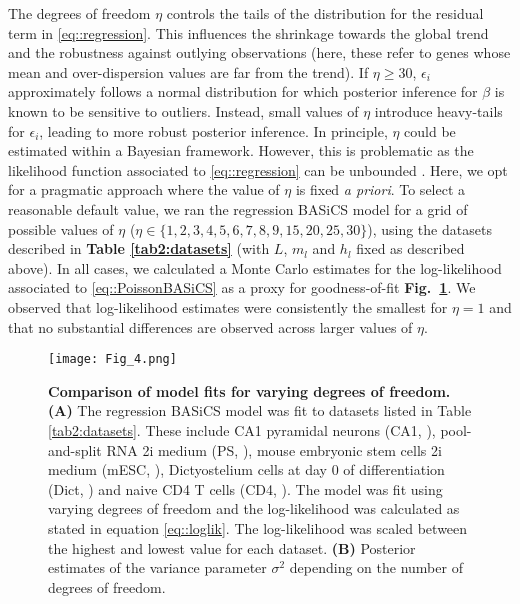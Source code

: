 The degrees of freedom $\eta$ controls the tails of the distribution for the residual term in \ref{eq::regression}. This influences the shrinkage towards the global trend and the robustness against outlying observations (here, these refer to genes whose mean and over-dispersion values are far from the trend).  If $\eta \geq 30$, $\epsilon_i$ approximately follows a normal distribution for which posterior inference for $\beta$ is known to be sensitive to outliers. Instead, small values of $\eta$ introduce heavy-tails for $\epsilon_i$, leading to more robust posterior inference. In principle, $\eta$ could be estimated within a Bayesian framework. However, this is problematic as the likelihood function associated to \ref{eq::regression} can be unbounded \citep{Fernandez1999}. Here, we opt for a pragmatic approach where the value of $\eta$ is fixed \emph{a priori}. To select a reasonable default value, we ran the regression BASiCS model for a grid of possible values of $\eta$ ($\eta \in \{ 1,2,3,4,5,6,7,8,9,15,20,25,30 \}$), using the datasets described in \textbf{Table \ref{tab2:datasets}} (with $L$, $m_l$ and $h_l$ fixed as described above). In all cases, we calculated a Monte Carlo estimates for the log-likelihood associated to \ref{eq::PoissonBASiCS} as a proxy for goodness-of-fit \textbf{Fig.~\ref{fig2:DoF}}. We observed that log-likelihood estimates were consistently the smallest for $\eta=1$ and that no substantial differences are observed across larger values of $\eta$. \\ 

\begin{figure}[!h]
\centering
\texttt{[image: Fig\_4.png]}
\caption[Comparison of model fits for varying degrees of freedom]{\textbf{Comparison of model fits for varying degrees of freedom.}\\
\textbf{(A)} The regression BASiCS model was fit to datasets listed in Table \ref{tab2:datasets}. These include CA1 pyramidal neurons (CA1, \citep{Zeisel2015}), pool-and-split RNA 2i medium (PS, \citep{Grun2014}), mouse embryonic stem cells 2i medium (mESC, \citep{Grun2014}), Dictyostelium cells at day 0 of differentiation (Dict, \citep{Antolovic2017}) and naive CD4\plus{} T cells (CD4, \citep{Martinez-jimenez2017}). The model was fit using varying degrees of freedom and the log-likelihood was calculated as stated in equation \ref{eq::loglik}. The log-likelihood was scaled between the highest and lowest value for each dataset. \textbf{(B)} Posterior estimates of the variance parameter $\sigma^2$ depending on the number of degrees of freedom.}
\label{fig2:DoF}
\end{figure}

